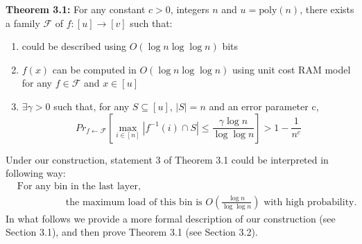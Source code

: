 \documentclass[a4paper, english]{paper}
\begin{document}
	\noindent\textbf{Theorem 3.1:} For any constant $c>0$, integers $n$ and $u=\text{poly}(n)$, there exists a family  $\mathscr{F}$ of $f:[u]\rightarrow[v]$ such that:
	\begin{enumerate}
	\item could be described using $O(\log n \log\log n)$ bits
	\item $f(x)$ can be computed in $O(\log n \log\log n)$ using unit cost RAM model for any $f\in \mathscr{F}$ and $x\in[u]$
	\item $\exists \gamma>0$ such that, for any $S\subseteq[u]$, $|S|=n$ and an error parameter c,
		$${Pr}_{f\leftarrow \mathscr{F}}\left[\max_{i\in[n]}|f^{-1}(i) \cap S|\le \frac{\gamma\log n}{\log\log n}\right]> 1-\frac1{n^c}$$
	\end{enumerate}
\quad	Under our construction, statement 3 of Theorem 3.1 could be interpreted in following way:
	\begin{align*}
	&\text{For any bin in the last layer,}\\
	& \qquad\qquad\quad\text{the maximum load of this bin is } O(\frac{\log n}{\log\log n}) \text{ with high probability.}
	\end{align*}
\quad	In what follows we provide a more formal description of our construction (see Section 3.1), and then prove Theorem 3.1 (see Section 3.2).
	
\end{document}
